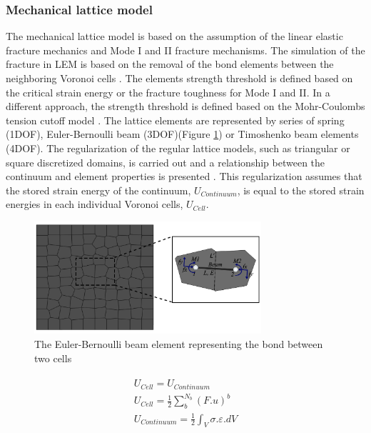 \subsubsection*{Mechanical lattice model}

The mechanical lattice model is based on the assumption of the linear elastic fracture mechanics and Mode I and II fracture mechanisms. The simulation of the fracture in LEM is based on the removal of the bond elements between the neighboring Voronoi cells \cite{Rizvietal2019a}. The elements strength threshold is defined based on the critical strain energy or the fracture toughness for Mode I and II. In a different approach, the strength threshold is defined based on the Mohr-Coulombs tension cutoff model \cite{Bolanderetal1998}. The lattice elements are represented by series of spring (1DOF),  Euler-Bernoulli beam (3DOF)(Figure \ref{fig:Amir_LEM_Beam}) or Timoshenko beam elements (4DOF). The regularization of the regular lattice models, such as triangular or square discretized domains, is carried out and a relationship between the continuum and element properties is presented \cite{Ostojastarzewski2002, Karihalooetal2003}. This regularization assumes that the stored strain energy of the continuum, $U_{Continuum}$, is equal to the stored strain energies in each individual Voronoi cells, $U_{Cell}$. 

\begin{figure}[!ht]
\centering
\includegraphics[width=0.75\textwidth]{figures/Amir_LEM_Beam.png}
\caption{The Euler-Bernoulli beam element representing the bond between two cells}
\label{fig:Amir_LEM_Beam}
\end{figure}

\begin{align}
\label{eq:LEM_Mechanical_1}
\begin{split}
 U_{Cell}=U_{Continuum}\\
 U_{Cell}=\frac{1}{2}\sum_{b}^{N_b}\left(F.u\right)^b\\
 U_{Continuum}=\frac{1}{2}\int_{V}{\sigma.\varepsilon.dV}
\end{split}
\end{align}

